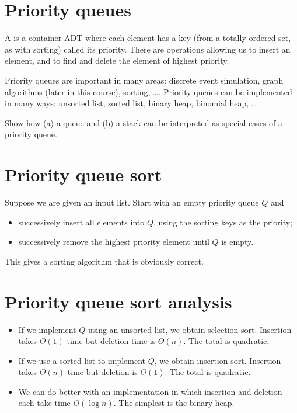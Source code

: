 \section{Priority queues}
\begin{Definition}
A  is a container ADT where each element 
has a key (from a totally ordered set, as with sorting) called its priority. There are operations allowing us to insert an 
element, and to find and delete the element of highest priority. 
\end{Definition}

Priority queues are important in many areas: discrete event simulation, 
graph algorithms (later in this course), sorting, \dots .
Priority queues can be implemented in many ways: unsorted list, sorted 
list, binary heap, binomial heap, \dots . 

\begin{Boxample}[5]
Show how (a) a queue and (b) a stack can be interpreted as special cases of a priority queue.
\end{Boxample}

\section{Priority queue sort}
Suppose we are given an input list. Start with an empty priority queue $Q$
and
\begin{itemize}
\item successively insert all elements into $Q$, using the sorting keys as the 
priority;
\item successively remove the highest priority element until $Q$ is empty. 
\end{itemize}
This gives a sorting algorithm that is obviously correct. 

\section{Priority queue sort analysis}
\begin{itemize}
\item If we implement $Q$ using an unsorted list, we obtain selection sort. 
Insertion takes $\Theta(1)$ time but deletion time is $\Theta(n)$. The total is quadratic.
\item If we use a sorted list to implement $Q$, we obtain insertion sort. 
Insertion takes $\Theta(n)$ time but deletion is $\Theta(1)$. The total is quadratic.
\item We can do better with an implementation in which insertion and deletion 
each take time $O(\log n)$. The simplest is the binary heap.
\end{itemize}

